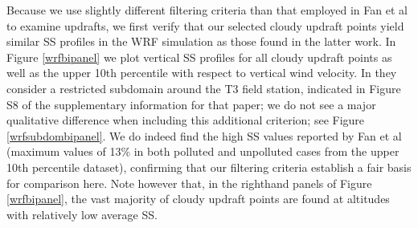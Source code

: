 \documentclass{article}
\begin{document}
Because we use slightly different filtering criteria than that employed in Fan et al to examine updrafts, we first verify that our selected cloudy updraft points yield similar SS profiles in the WRF simulation as those found in the latter work. In Figure \ref{wrfbipanel} we plot vertical SS profiles for all cloudy updraft points as well as the upper 10th percentile with respect to vertical wind velocity. In \cite{Fan2018} they consider a restricted subdomain around the T3 field station, indicated in Figure S8 of the supplementary information for that paper; we do not see a major qualitative difference when including this additional criterion; see Figure \ref{wrfsubdombipanel}. We do indeed find the high SS values reported by Fan et al (maximum values of 13\% in both polluted and unpolluted cases from the upper 10th percentile dataset), confirming that our filtering criteria establish a fair basis for comparison here. Note however that, in the righthand panels of Figure \ref{wrfbipanel}, the vast majority of cloudy updraft points are found at altitudes with relatively low average SS.
\end{document}
